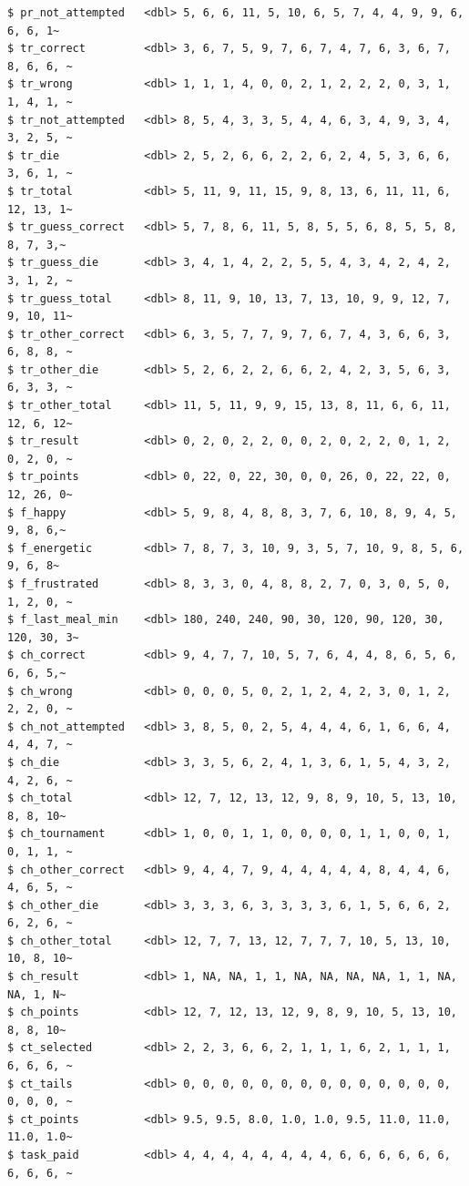 \documentclass[
  letterpaper,
]{book}
\begin{document}
\begin{verbatim}
$ pr_not_attempted   <dbl> 5, 6, 6, 11, 5, 10, 6, 5, 7, 4, 4, 9, 9, 6, 6, 6, 1~
$ tr_correct         <dbl> 3, 6, 7, 5, 9, 7, 6, 7, 4, 7, 6, 3, 6, 7, 8, 6, 6, ~
$ tr_wrong           <dbl> 1, 1, 1, 4, 0, 0, 2, 1, 2, 2, 2, 0, 3, 1, 1, 4, 1, ~
$ tr_not_attempted   <dbl> 8, 5, 4, 3, 3, 5, 4, 4, 6, 3, 4, 9, 3, 4, 3, 2, 5, ~
$ tr_die             <dbl> 2, 5, 2, 6, 6, 2, 2, 6, 2, 4, 5, 3, 6, 6, 3, 6, 1, ~
$ tr_total           <dbl> 5, 11, 9, 11, 15, 9, 8, 13, 6, 11, 11, 6, 12, 13, 1~
$ tr_guess_correct   <dbl> 5, 7, 8, 6, 11, 5, 8, 5, 5, 6, 8, 5, 5, 8, 8, 7, 3,~
$ tr_guess_die       <dbl> 3, 4, 1, 4, 2, 2, 5, 5, 4, 3, 4, 2, 4, 2, 3, 1, 2, ~
$ tr_guess_total     <dbl> 8, 11, 9, 10, 13, 7, 13, 10, 9, 9, 12, 7, 9, 10, 11~
$ tr_other_correct   <dbl> 6, 3, 5, 7, 7, 9, 7, 6, 7, 4, 3, 6, 6, 3, 6, 8, 8, ~
$ tr_other_die       <dbl> 5, 2, 6, 2, 2, 6, 6, 2, 4, 2, 3, 5, 6, 3, 6, 3, 3, ~
$ tr_other_total     <dbl> 11, 5, 11, 9, 9, 15, 13, 8, 11, 6, 6, 11, 12, 6, 12~
$ tr_result          <dbl> 0, 2, 0, 2, 2, 0, 0, 2, 0, 2, 2, 0, 1, 2, 0, 2, 0, ~
$ tr_points          <dbl> 0, 22, 0, 22, 30, 0, 0, 26, 0, 22, 22, 0, 12, 26, 0~
$ f_happy            <dbl> 5, 9, 8, 4, 8, 8, 3, 7, 6, 10, 8, 9, 4, 5, 9, 8, 6,~
$ f_energetic        <dbl> 7, 8, 7, 3, 10, 9, 3, 5, 7, 10, 9, 8, 5, 6, 9, 6, 8~
$ f_frustrated       <dbl> 8, 3, 3, 0, 4, 8, 8, 2, 7, 0, 3, 0, 5, 0, 1, 2, 0, ~
$ f_last_meal_min    <dbl> 180, 240, 240, 90, 30, 120, 90, 120, 30, 120, 30, 3~
$ ch_correct         <dbl> 9, 4, 7, 7, 10, 5, 7, 6, 4, 4, 8, 6, 5, 6, 6, 6, 5,~
$ ch_wrong           <dbl> 0, 0, 0, 5, 0, 2, 1, 2, 4, 2, 3, 0, 1, 2, 2, 2, 0, ~
$ ch_not_attempted   <dbl> 3, 8, 5, 0, 2, 5, 4, 4, 4, 6, 1, 6, 6, 4, 4, 4, 7, ~
$ ch_die             <dbl> 3, 3, 5, 6, 2, 4, 1, 3, 6, 1, 5, 4, 3, 2, 4, 2, 6, ~
$ ch_total           <dbl> 12, 7, 12, 13, 12, 9, 8, 9, 10, 5, 13, 10, 8, 8, 10~
$ ch_tournament      <dbl> 1, 0, 0, 1, 1, 0, 0, 0, 0, 1, 1, 0, 0, 1, 0, 1, 1, ~
$ ch_other_correct   <dbl> 9, 4, 4, 7, 9, 4, 4, 4, 4, 4, 8, 4, 4, 6, 4, 6, 5, ~
$ ch_other_die       <dbl> 3, 3, 3, 6, 3, 3, 3, 3, 6, 1, 5, 6, 6, 2, 6, 2, 6, ~
$ ch_other_total     <dbl> 12, 7, 7, 13, 12, 7, 7, 7, 10, 5, 13, 10, 10, 8, 10~
$ ch_result          <dbl> 1, NA, NA, 1, 1, NA, NA, NA, NA, 1, 1, NA, NA, 1, N~
$ ch_points          <dbl> 12, 7, 12, 13, 12, 9, 8, 9, 10, 5, 13, 10, 8, 8, 10~
$ ct_selected        <dbl> 2, 2, 3, 6, 6, 2, 1, 1, 1, 6, 2, 1, 1, 1, 6, 6, 6, ~
$ ct_tails           <dbl> 0, 0, 0, 0, 0, 0, 0, 0, 0, 0, 0, 0, 0, 0, 0, 0, 0, ~
$ ct_points          <dbl> 9.5, 9.5, 8.0, 1.0, 1.0, 9.5, 11.0, 11.0, 11.0, 1.0~
$ task_paid          <dbl> 4, 4, 4, 4, 4, 4, 4, 4, 6, 6, 6, 6, 6, 6, 6, 6, 6, ~

\end{verbatim}
\end{document}
